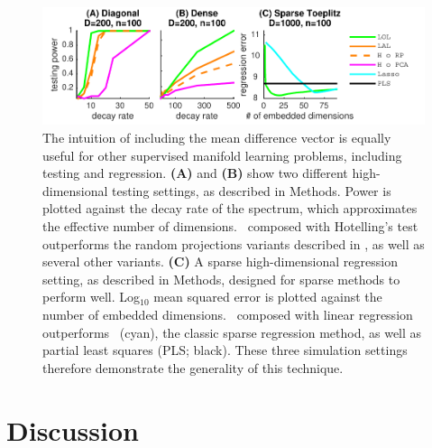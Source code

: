 \documentclass[10pt]{article}
\begin{document}
\begin{figure}
\centering
\includegraphics[width=1\linewidth]{../Figs/regression_power}
\caption{
The intuition of including the mean difference vector is equally useful for other supervised manifold learning problems, including testing and regression.
\textbf{(A)} and \textbf{(B)} show two different high-dimensional testing settings, as described in Methods.  Power is plotted against the decay rate of the spectrum, which approximates the effective number of dimensions.  \Lol~composed with Hotelling's test outperforms the random projections variants described in \cite{Lopes2011a}, as well as several other variants.
\textbf{(C)} A sparse high-dimensional regression setting, as described in Methods, designed for sparse methods to perform well.  Log$_{10}$ mean squared error is plotted against the number of embedded dimensions.
\Lol~composed with linear regression outperforms ~(cyan), the classic sparse regression method, as well as partial least squares (PLS; black).
These three simulation settings therefore demonstrate the generality of this technique.
}
\label{f:generalizations}
\end{figure}


\section*{Discussion}
\end{document}

